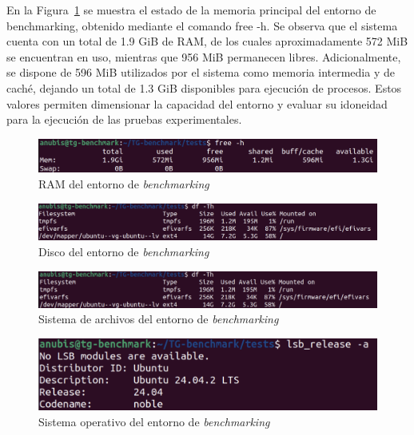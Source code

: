 \noindent
En la Figura~\ref{fig:RAM-benchmarking} se muestra el estado de la memoria principal del entorno de benchmarking, obtenido mediante el comando free -h. Se observa que el sistema cuenta con un total de 1.9 GiB de RAM, de los cuales aproximadamente 572 MiB se encuentran en uso, mientras que 956 MiB permanecen libres. Adicionalmente, se dispone de 596 MiB utilizados por el sistema como memoria intermedia y de caché, dejando un total de 1.3 GiB disponibles para ejecución de procesos. Estos valores permiten dimensionar la capacidad del entorno y evaluar su idoneidad para la ejecución de las pruebas experimentales.
\begin{figure}[H]
    \centering
    \includegraphics[width=\textwidth,height=0.85\textheight,keepaspectratio]{apendices/ENV-BENCH/RAM.png}
    \caption{RAM del entorno de \textit{benchmarking}}\label{fig:RAM-benchmarking}
\end{figure}

\begin{figure}[H]
    \centering
    \includegraphics[width=\textwidth,height=0.85\textheight,keepaspectratio]{apendices/ENV-BENCH/DISCO.png}
    \caption{Disco del entorno de \textit{benchmarking}}\label{fig:DISK-benchmarking}
\end{figure}

\begin{figure}[H]
    \centering
    \includegraphics[width=\textwidth,height=0.85\textheight,keepaspectratio]{apendices/ENV-BENCH/FS.png}
    \caption{Sistema de archivos del entorno de \textit{benchmarking}}\label{fig:FS-benchmarking}
\end{figure}

\begin{figure}[H]
    \centering
    \includegraphics[width=\textwidth,height=0.85\textheight,keepaspectratio]{apendices/ENV-BENCH/OS.png}
    \caption{Sistema operativo del entorno de \textit{benchmarking}}\label{fig:OS-benchmarking}
\end{figure}

